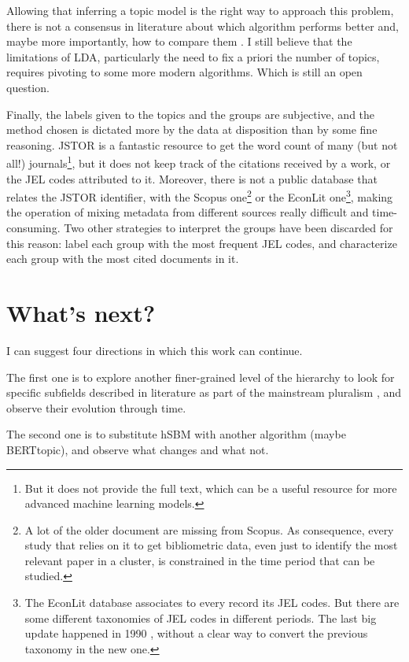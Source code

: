 \documentclass[a4paper, 11pt, headings=standardclasses, tablecaptionsbelow]{scrartcl}
\begin{document}
Allowing that inferring a topic model is the right way to approach this problem, there is not a consensus in literature about which algorithm performs better and, maybe more importantly, how to compare them \parencite[a recent and rare attempt is][]{shi2019}. I still believe that the limitations of LDA, particularly the need to fix a priori the number of topics, requires pivoting to some more modern algorithms. Which is still an open question.

Finally, the labels given to the topics and the groups are subjective, and the method chosen is dictated more by the data at disposition than by some fine reasoning.
JSTOR is a fantastic resource to get the word count of many (but not all!) journals\footnote{But it does not provide the full text, which can be a useful resource for more advanced machine learning models.}, but it does not keep track of the citations received by a work, or the JEL codes attributed to it. Moreover, there is not a public database that relates the JSTOR identifier, with the Scopus one\footnote{A lot of the older document are missing from Scopus. As consequence, every study that relies on it to get bibliometric data, even just to identify the most relevant paper in a cluster, is constrained in the time period that can be studied.} or the EconLit one\footnote{The EconLit database associates to every record its JEL codes. But there are some different taxonomies of JEL codes in different periods. The last big update happened in 1990 \parencite{cherrier2017}, without a clear way to convert the previous taxonomy in the new one.}, making the operation of mixing metadata from different sources really difficult and time-consuming.
Two other strategies to interpret the groups have been discarded for this reason: label each group with the most frequent JEL codes, and characterize each group with the most cited documents in it.

\section{What's next?}
I can suggest four directions in which this work can continue.

The first one is to explore another finer-grained level of the hierarchy to look for specific subfields described in literature as part of the mainstream pluralism \parencite[§1]{davis2006}, and observe their evolution through time.

The second one is to substitute hSBM with another algorithm (maybe BERTtopic), and observe what changes and what not.
\end{document}
